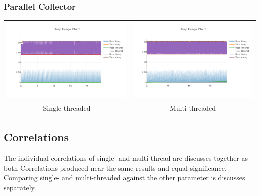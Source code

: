 \documentclass[11pt,a4paper]{article}
\begin{document}
\subsubsection{Parallel  Collector}
\begin{tabular}{ c c }
    \includegraphics[width=0.5\linewidth]{heap_single_parallel.png}     & \includegraphics[width=0.5\linewidth]{heap_multi_parallel.png} \\
    Single-threaded                                                     & Multi-threaded
\end{tabular}

\newpage

\subsection{Correlations}
The individual correlations of single- and multi-thread are discusses together as both Correlations produced near the same results and equal significance. Comparing single- and multi-threaded against the other parameter is discusses separately.
\end{document}
